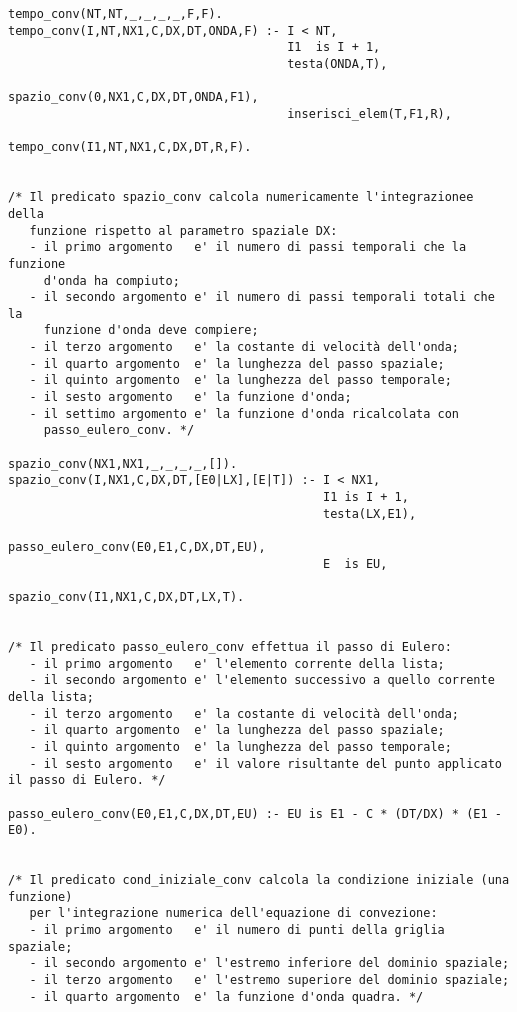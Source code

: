 \begin{verbatim}
tempo_conv(NT,NT,_,_,_,_,F,F).
tempo_conv(I,NT,NX1,C,DX,DT,ONDA,F) :- I < NT,
                                       I1  is I + 1,
                                       testa(ONDA,T),                
                                       spazio_conv(0,NX1,C,DX,DT,ONDA,F1), 
                                       inserisci_elem(T,F1,R),                
                                       tempo_conv(I1,NT,NX1,C,DX,DT,R,F). 


/* Il predicato spazio_conv calcola numericamente l'integrazionee della
   funzione rispetto al parametro spaziale DX:
   - il primo argomento   e' il numero di passi temporali che la funzione
     d'onda ha compiuto;
   - il secondo argomento e' il numero di passi temporali totali che la
     funzione d'onda deve compiere; 
   - il terzo argomento   e' la costante di velocità dell'onda;      
   - il quarto argomento  e' la lunghezza del passo spaziale;
   - il quinto argomento  e' la lunghezza del passo temporale;
   - il sesto argomento   e' la funzione d'onda;
   - il settimo argomento e' la funzione d'onda ricalcolata con 
     passo_eulero_conv. */

spazio_conv(NX1,NX1,_,_,_,_,[]).
spazio_conv(I,NX1,C,DX,DT,[E0|LX],[E|T]) :- I < NX1,
                                            I1 is I + 1,
                                            testa(LX,E1),
                                            passo_eulero_conv(E0,E1,C,DX,DT,EU),
                                            E  is EU,
                                            spazio_conv(I1,NX1,C,DX,DT,LX,T).


/* Il predicato passo_eulero_conv effettua il passo di Eulero:
   - il primo argomento   e' l'elemento corrente della lista;
   - il secondo argomento e' l'elemento successivo a quello corrente della lista;
   - il terzo argomento   e' la costante di velocità dell'onda;
   - il quarto argomento  e' la lunghezza del passo spaziale;
   - il quinto argomento  e' la lunghezza del passo temporale;
   - il sesto argomento   e' il valore risultante del punto applicato il passo di Eulero. */

passo_eulero_conv(E0,E1,C,DX,DT,EU) :- EU is E1 - C * (DT/DX) * (E1 - E0).


/* Il predicato cond_iniziale_conv calcola la condizione iniziale (una funzione)
   per l'integrazione numerica dell'equazione di convezione:
   - il primo argomento   e' il numero di punti della griglia spaziale;
   - il secondo argomento e' l'estremo inferiore del dominio spaziale;
   - il terzo argomento   e' l'estremo superiore del dominio spaziale; 
   - il quarto argomento  e' la funzione d'onda quadra. */


\end{verbatim}
